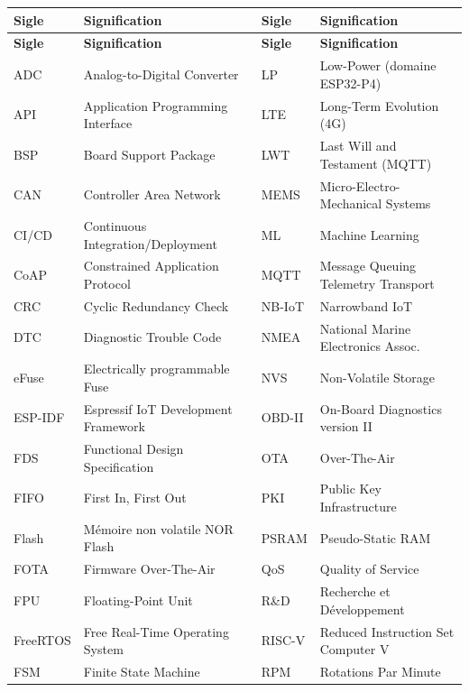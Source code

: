 \setlength{\tabcolsep}{4pt}
\renewcommand{\arraystretch}{1.22}
\noindent
\begin{longtable}{p{1.75cm}p{5.85cm}p{1.75cm}p{5.85cm}}
\hline
\textbf{Sigle} & \textbf{Signification} & \textbf{Sigle} & \textbf{Signification}\\
\hline
\endfirsthead
\hline
\textbf{Sigle} & \textbf{Signification} & \textbf{Sigle} & \textbf{Signification}\\
\hline
\endhead
\hline
\endfoot

ADC      & Analog-to-Digital Converter        & LP      & Low-Power (domaine ESP32-P4)\\
API      & Application Programming Interface   & LTE     & Long-Term Evolution (4G)\\
BSP      & Board Support Package               & LWT     & Last Will and Testament (MQTT)\\
CAN      & Controller Area Network             & MEMS    & Micro-Electro-Mechanical Systems\\
CI/CD    & Continuous Integration/Deployment   & ML      & Machine Learning\\
CoAP     & Constrained Application Protocol    & MQTT    & Message Queuing Telemetry Transport\\
CRC      & Cyclic Redundancy Check             & NB-IoT  & Narrowband IoT\\
DTC      & Diagnostic Trouble Code             & NMEA    & National Marine Electronics Assoc.\\
eFuse    & Electrically programmable Fuse       & NVS     & Non-Volatile Storage\\
ESP-IDF  & Espressif IoT Development Framework & OBD-II  & On-Board Diagnostics version II\\
FDS      & Functional Design Specification      & OTA     & Over-The-Air\\
FIFO     & First In, First Out                  & PKI     & Public Key Infrastructure\\
Flash    & Mémoire non volatile NOR Flash       & PSRAM   & Pseudo-Static RAM\\
FOTA     & Firmware Over-The-Air               & QoS     & Quality of Service\\
FPU      & Floating-Point Unit                  & R\&D    & Recherche et Développement\\
FreeRTOS & Free Real-Time Operating System      & RISC-V  & Reduced Instruction Set Computer V\\
FSM      & Finite State Machine                 & RPM     & Rotations Par Minute\\

\end{longtable}
